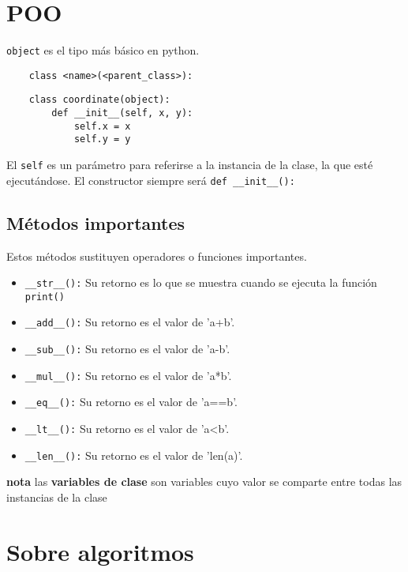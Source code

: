 \section{POO}

\texttt{object} es el tipo más básico en python.

\begin{verbatim}
    class <name>(<parent_class>):
\end{verbatim}

\begin{verbatim}
    class coordinate(object):
        def __init__(self, x, y):
            self.x = x
            self.y = y
\end{verbatim}

El \texttt{self} es un parámetro para referirse a la instancia de la clase, la
que esté ejecutándose. El constructor siempre será \texttt{def
    \_\_init\_\_():}\\

\subsection{Métodos importantes}

Estos métodos sustituyen operadores o funciones importantes.

\begin{itemize}
    \item \texttt{\_\_str\_\_():} Su retorno es lo que se muestra cuando se
          ejecuta la función \texttt{print()}
    \item \texttt{\_\_add\_\_():} Su retorno es el valor de 'a+b'.
    \item \texttt{\_\_sub\_\_():} Su retorno es el valor de 'a-b'.
    \item \texttt{\_\_mul\_\_():} Su retorno es el valor de 'a*b'.
    \item \texttt{\_\_eq\_\_():} Su retorno es el valor de 'a==b'.
    \item \texttt{\_\_lt\_\_():} Su retorno es el valor de 'a<b'.
    \item \texttt{\_\_len\_\_():} Su retorno es el valor de 'len(a)'.
\end{itemize}

\textbf{nota} las \textbf{variables de clase} son variables cuyo valor se
comparte entre todas las instancias de la clase

\section{Sobre algoritmos}

